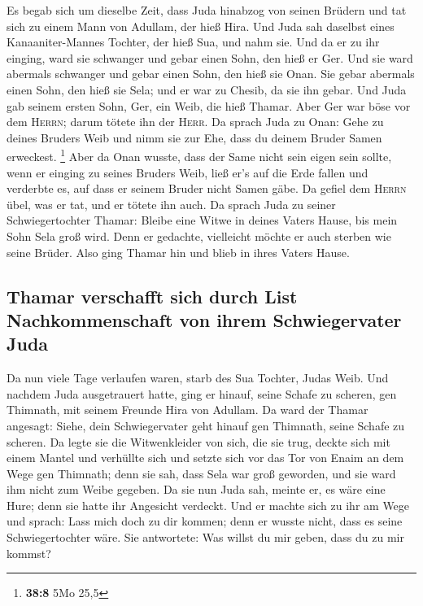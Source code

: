  Es begab sich um dieselbe Zeit, dass Juda hinabzog von
seinen Brüdern und tat sich zu einem Mann von Adullam, der hieß Hira.
 Und Juda sah daselbst eines Kanaaniter-Mannes Tochter,
der hieß Sua, und nahm sie. Und da er zu ihr einging, 
ward sie schwanger und gebar einen Sohn, den hieß er Ger. 
Und sie ward abermals schwanger und gebar einen Sohn, den hieß sie Onan.
 Sie gebar abermals einen Sohn, den hieß sie Sela; und er
war zu Chesib, da sie ihn gebar.  Und Juda gab seinem
ersten Sohn, Ger, ein Weib, die hieß Thamar.  Aber Ger war
böse vor dem \textsc{Herrn}; darum tötete ihn der \textsc{Herr}.
 Da sprach Juda zu Onan: Gehe zu deines Bruders Weib und
nimm sie zur Ehe, dass du deinem Bruder Samen erweckest. \footnote{\textbf{38:8}
  5Mo 25,5}  Aber da Onan wusste, dass der Same nicht sein
eigen sein sollte, wenn er einging zu seines Bruders Weib, ließ er's auf
die Erde fallen und verderbte es, auf dass er seinem Bruder nicht Samen
gäbe.  Da gefiel dem \textsc{Herrn} übel, was er tat, und
er tötete ihn auch.  Da sprach Juda zu seiner
Schwiegertochter Thamar: Bleibe eine Witwe in deines Vaters Hause, bis
mein Sohn Sela groß wird. Denn er gedachte, vielleicht möchte er auch
sterben wie seine Brüder. Also ging Thamar hin und blieb in ihres Vaters
Hause.

\hypertarget{thamar-verschafft-sich-durch-list-nachkommenschaft-von-ihrem-schwiegervater-juda}{%
\subsection{Thamar verschafft sich durch List Nachkommenschaft von ihrem
Schwiegervater
Juda}\label{thamar-verschafft-sich-durch-list-nachkommenschaft-von-ihrem-schwiegervater-juda}}

 Da nun viele Tage verlaufen waren, starb des Sua
Tochter, Judas Weib. Und nachdem Juda ausgetrauert hatte, ging er
hinauf, seine Schafe zu scheren, gen Thimnath, mit seinem Freunde Hira
von Adullam.  Da ward der Thamar angesagt: Siehe, dein
Schwiegervater geht hinauf gen Thimnath, seine Schafe zu scheren.
 Da legte sie die Witwenkleider von sich, die sie trug,
deckte sich mit einem Mantel und verhüllte sich und setzte sich vor das
Tor von Enaim an dem Wege gen Thimnath; denn sie sah, dass Sela war groß
geworden, und sie ward ihm nicht zum Weibe gegeben.  Da
sie nun Juda sah, meinte er, es wäre eine Hure; denn sie hatte ihr
Angesicht verdeckt.  Und er machte sich zu ihr am Wege
und sprach: Lass mich doch zu dir kommen; denn er wusste nicht, dass es
seine Schwiegertochter wäre. Sie antwortete: Was willst du mir geben,
dass du zu mir kommst?

